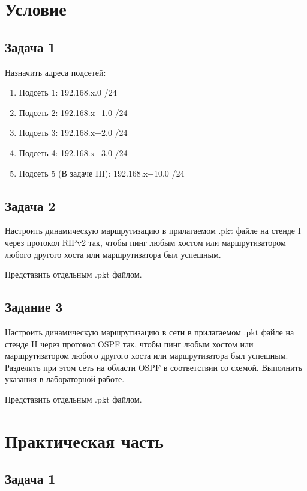 \chapter{Условие}%
\label{cha:uslovie}

\section{Задача 1}%
\label{sec:task_1}
Назначить адреса подсетей:

\begin{enumerate}
    \item Подсеть 1: 192.168.x.0 /24
    \item Подсеть 2: 192.168.x+1.0 /24
    \item Подсеть 3: 192.168.x+2.0 /24
    \item Подсеть 4: 192.168.x+3.0 /24
    \item Подсеть 5 (В задаче III): 192.168.x+10.0 /24
\end{enumerate}

\section{Задача 2}%
\label{sec:task_2}

Настроить динамическую маршрутизацию в прилагаемом .pkt файле на стенде I через протокол RIPv2 так, чтобы пинг любым хостом или маршрутизатором любого другого хоста или маршрутизатора был успешным.

Представить отдельным .pkt файлом.
\section{Задание 3}
\label{sec:task_3}

Настроить динамическую маршрутизацию в сети в прилагаемом .pkt файле на стенде II через протокол OSPF так, чтобы пинг любым хостом или маршрутизатором любого другого хоста или маршрутизатора был успешным. Разделить при этом сеть на области OSPF в соответствии со схемой. Выполнить указания в лабораторной работе.

Представить отдельным .pkt файлом.

\chapter{Практическая часть}%
\label{cha:prakticheskaia_chast_}

\section{Задача 1}%
\label{sec:1}

